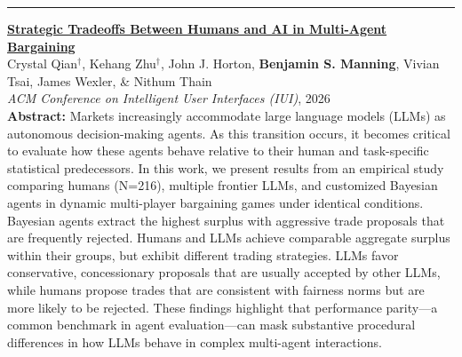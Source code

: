 \documentclass[11pt]{article}
\newenvironment{publist}
  {\begin{list}{}{%
    \setlength{\leftmargin}{1.5em}%
    \setlength{\itemindent}{-1.5em}%
    \setlength{\itemsep}{10pt}%
    \setlength{\parsep}{0pt}%
    \setlength{\topsep}{4pt}}}
  {\end{list}}
\newcommand{\pubsection}[1]{\Needspace*{6\baselineskip}\vspace{6pt}{\large\scshape #1}\par\vspace{-4pt}\rule{\textwidth}{0.4pt}}
\begin{document}
\pubsection{Refereed Conference Proceedings}
\begin{publist}
\item \href{https://dl.acm.org/doi/10.1145/3742413.3789078}{\textbf{Strategic Tradeoffs Between Humans and AI in Multi-Agent Bargaining}}\\
Crystal Qian$^\dagger$, Kehang Zhu$^\dagger$, John J. Horton, \textbf{Benjamin S. Manning}, Vivian Tsai, James Wexler, \& Nithum Thain\\
\textit{ACM Conference on Intelligent User Interfaces (IUI)}, 2026\\[3pt]
{\footnotesize \textbf{Abstract: }Markets increasingly accommodate large language models (LLMs) as autonomous decision-making agents. As this transition occurs, it becomes critical to evaluate how these agents behave relative to their human and task-specific statistical predecessors. In this work, we present results from an empirical study comparing humans (N=216), multiple frontier LLMs, and customized Bayesian agents in dynamic multi-player bargaining games under identical conditions. Bayesian agents extract the highest surplus with aggressive trade proposals that are frequently rejected. Humans and LLMs achieve comparable aggregate surplus within their groups, but exhibit different trading strategies. LLMs favor conservative, concessionary proposals that are usually accepted by other LLMs, while humans propose trades that are consistent with fairness norms but are more likely to be rejected. These findings highlight that performance parity---a common benchmark in agent evaluation---can mask substantive procedural differences in how LLMs behave in complex multi-agent interactions.}
\end{publist}
\end{document}
